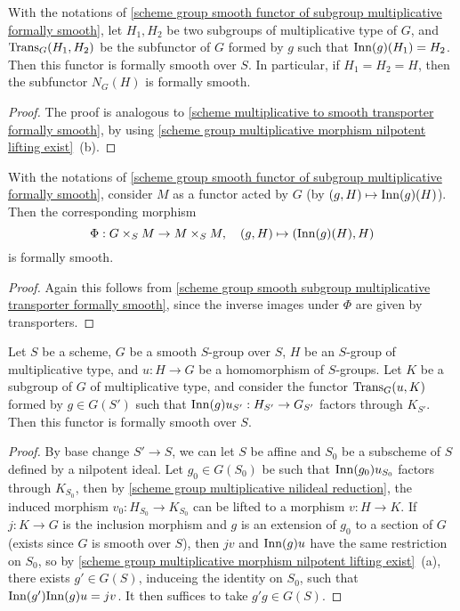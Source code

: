 \begin{corollary}\label{scheme group smooth subgroup multiplicative transporter formally smooth}
With the notations of \cref{scheme group smooth functor of subgroup multiplicative formally smooth}, let $H_1,H_2$ be two subgroups of multiplicative type of $G$, and $\mathrm{Trans}_G(H_1,H_2)$ be the subfunctor of $G$ formed by $g$ such that $\mathrm{Inn}(g)(H_1)=H_2$. Then this functor is formally smooth over $S$. In particular, if $H_1=H_2=H$, then the subfunctor $N_G(H)$ is formally smooth.
\end{corollary}
\begin{proof}
The proof is analogous to \cref{scheme multiplicative to smooth transporter formally smooth}, by using \cref{scheme group multiplicative morphism nilpotent lifting exist}~(b).
\end{proof}

\begin{corollary}\label{scheme group smooth functor of subgroup multiplicative action morphism formally smooth}
With the notations of \cref{scheme group smooth functor of subgroup multiplicative formally smooth}, consider $M$ as a functor acted by $G$ (by $(g,H)\mapsto\mathrm{Inn}(g)(H)$). Then the corresponding morphism
\[\Phi:G\times_SM\to M\times_SM,\quad (g,H)\mapsto(\mathrm{Inn}(g)(H),H)\]
is formally smooth.
\end{corollary}
\begin{proof}
Again this follows from \cref{scheme group smooth subgroup multiplicative transporter formally smooth}, since the inverse images under $\Phi$ are given by transporters.
\end{proof}

\begin{proposition}\label{scheme group smooth to multiplicative subgroup transporter formally smooth}
Let $S$ be a scheme, $G$ be a smooth $S$-group over $S$, $H$ be an $S$-group of multiplicative type, and $u:H\to G$ be a homomorphism of $S$-groups. Let $K$ be a subgroup of $G$ of multiplicative type, and consider the functor $\mathrm{Trans}_G(u,K)$ formed by $g\in G(S')$ such that $\mathrm{Inn}(g)u_{S'}:H_{S'}\to G_{S'}$ factors through $K_{S'}$. Then this functor is formally smooth over $S$.
\end{proposition}
\begin{proof}
By base change $S'\to S$, we can let $S$ be affine and $S_0$ be a subscheme of $S$ defined by a nilpotent ideal. Let $g_0\in G(S_0)$ be such that $\mathrm{Inn}(g_0)u_{S_0}$ factors through $K_{S_0}$, then by \cref{scheme group multiplicative nilideal reduction}, the induced morphism $v_0:H_{S_0}\to K_{S_0}$ can be lifted to a morphism $v:H\to K$. If $j:K\to G$ is the inclusion morphism and $g$ is an extension of $g_0$ to a section of $G$ (exists since $G$ is smooth over $S$), then $jv$ and $\mathrm{Inn}(g)u$ have the same restriction on $S_0$, so by \cref{scheme group multiplicative morphism nilpotent lifting exist}~(a), there exists $g'\in G(S)$, induceing the identity on $S_0$, such that $\mathrm{Inn}(g')\mathrm{Inn}(g)u=jv$. It then suffices to take $g'g\in G(S)$.
\end{proof}

